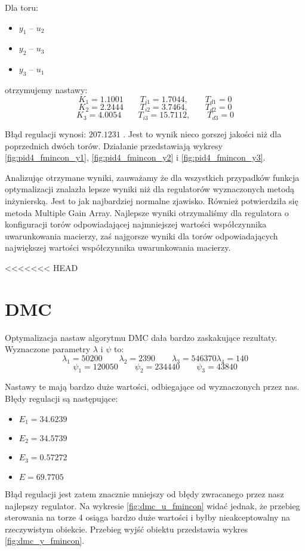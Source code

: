 Dla toru:
\begin{itemize}
  \item $y_1$ -- $u_2$
 \item $y_2$ -- $u_3$
 \item $y_3$ -- $u_1$
\end{itemize}

otrzymujemy nastawy:
\begin{equation}
  K_1 = \num{1,1001} \qquad T_{i1} = \num{1,7044}, \qquad T_{d1} = 0 \nonumber
\end{equation}
\begin{equation}
  K_2 = \num{2,2444} \qquad T_{i2} = \num{3,7464}, \qquad T_{d2} = 0
\end{equation}
\begin{equation}
  K_3 = \num{4,0054} \qquad T_{i3} = \num{15,7112}, \qquad T_{d3} = 0 \nonumber
\end{equation}

Błąd regulacji wynosi: $\num{207,1231}$ .
Jest to wynik nieco gorszej jakości niż dla poprzednich dwóch torów.
Działanie
przedstawiają wykresy \ref{fig:pid4_fmincon_y1}, \ref{fig:pid4_fmincon_y2} i \ref{fig:pid4_fmincon_y3}.

Analizując otrzymane wyniki, zauważamy że dla wszystkich przypadków funkcja optymalizacji
znalazła lepsze wyniki niż dla regulatorów wyznaczonych metodą inżynierską. Jest to jak najbardziej normalne zjawisko.
Również potwierdziła się metoda Multiple Gain Array. Najlepsze wyniki otrzymaliśmy dla regulatora o konfiguracji
torów odpowiadającej najmniejszej wartości współczynnika uwarunkowania macierzy, zaś najgorsze wyniki
dla torów odpowiadających największej wartości współczynnika uwarunkowania macierzy.

<<<<<<< HEAD
\section{DMC}
Optymalizacja nastaw algorytmu DMC dała bardzo zaskakujące rezultaty. Wyznaczone parametry $\lambda$ i $\psi$ to:
\begin{equation}
\lambda_1=\num{50200} \qquad \lambda_2 = 2390 \qquad \lambda_3 = 546370 \lambda_4 = 140
\end{equation}
\begin{equation}
\psi_1 = 120050 \qquad \psi_2 = 234440 \qquad \psi_3 = 43840
\end{equation}

Nastawy te mają bardzo duże wartości, odbiegające od wyznaczonych przez nas. Błędy regulacji są następujące:
\begin{itemize}
\item $E_1 = \num{34,6239}$
\item $E_2 = \num{34,5739}$
\item $E_3 = \num{0,57272}$
\item $E = \num{69,7705}$
\end{itemize}
Błąd regulacji jest zatem znacznie mniejszy od błędy zwracanego przez nasz najlepszy regulator. Na wykresie \ref{fig:dmc_u_fmincon} widać jednak, że przebieg sterowania na torze 4 osiąga bardzo duże wartości i byłby nieakceptowalny na rzeczywistym obiekcie. Przebieg wyjść obiektu przedstawia wykres \ref{fig:dmc_y_fmincon}.

